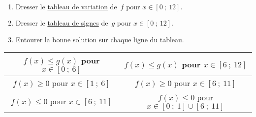 \exercice~\\[1em]
\noindent 
\begin{minipage}{0.22\textwidth}
	
\end{minipage}
\hfill
\begin{minipage}{0.23\textwidth}
\begin{enumerate}
	\item Dresser le \underline{tableau de variation} de~$f$ pour \mbox{$x \in [0~;~12]$}.\\
	\item Dresser le \underline{tableau de signes} de~$g$ pour \mbox{$x \in [0~;~12]$}.\\
	\item Entourer la bonne solution sur chaque ligne du tableau.
\end{enumerate}
\end{minipage}
\vspace*{2em}
\begin{center}
\begin{tabular}{|c|c|}
\hline 
\rule[-1ex]{0pt}{2.5ex} $f(x) \leqslant g(x)$ pour $x \in [0~;~6]$ & $f(x) \leqslant g(x)$ pour $x \in [6~;~12]$ \\ 
\hline 
\rule[-1ex]{0pt}{2.5ex} $f(x) \geqslant 0$ pour $x \in [1~;~6]$ & $f(x) \geqslant 0$ pour $x \in [6~;~11]$ \\ 
\hline 
\rule[-1ex]{0pt}{2.5ex} $f(x) \leqslant 0$ pour $x \in [6~;~11]$ & $f(x) \leqslant 0$ pour $x \in [0~;~1] \cup [6~;~11]$ \\ 
\hline 
\end{tabular} 
\end{center}